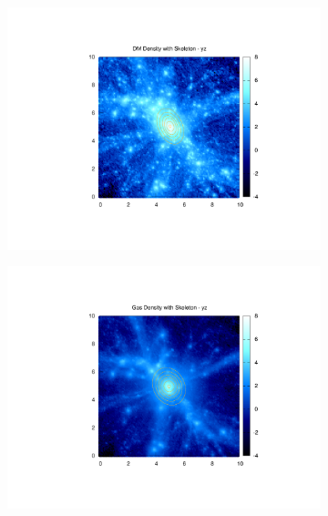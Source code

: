 \documentclass[journal]{IEEEtran}
\begin{document}
\begin{figure}[!t]
\begin{subfigure}[t]{0.3\textwidth}
		\includegraphics[width=\linewidth]{DMDenEllipyz.pdf}
	\end{subfigure}
	\quad
	\begin{subfigure}[t]{0.3\textwidth}
		\centering
		\includegraphics[width=\linewidth]{GasDenEllipyz.pdf}
	\end{subfigure}
	\quad
	\begin{subfigure}[t]{0.3\textwidth}
		\centering

\end{subfigure}
\end{figure}
\end{document}
